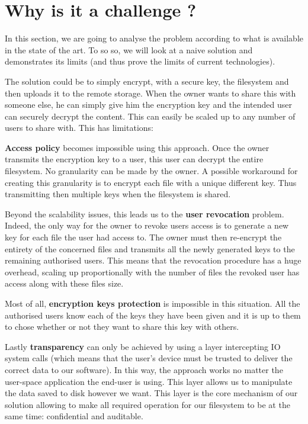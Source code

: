 \documentclass[../main.tex]{subfiles}
\begin{document}
\section{Why is it a challenge ?}
\label{section:problem:why_a_challenge}

\par In this section, we are going to analyse the problem according to what is available in the state of the art. To so so, we will look at a naive solution and demonstrates its limits (and thus prove the limits of current technologies).
\par The solution could be to simply encrypt, with a secure key, the filesystem and then uploads it to the remote storage. When the owner wants to share this with someone else, he can simply give him the encryption key and the intended user can securely decrypt the content. This can easily be scaled up to any number of users to share with. This has limitations:
\par \textbf{Access policy} becomes impossible using this approach. Once the owner transmits the encryption key to a user, this user can decrypt the entire filesystem. No granularity can be made by the owner. A possible workaround for creating this granularity is to encrypt each file with a unique different key. Thus transmitting then multiple keys when the filesystem is shared.
\par Beyond the scalability issues, this leads us to the \textbf{user revocation} problem. Indeed, the only way for the owner to revoke users access is to generate a new key for each file the user had access to. The owner must then re-encrypt the entirety of the concerned files and transmits all the newly generated keys to the remaining authorised users. This means that the revocation procedure has a huge overhead, scaling up proportionally with the number of files the revoked user has access along with these files size.
\par Most of all, \textbf{encryption keys protection} is impossible in this situation. All the authorised users know each of the keys they have been given and it is up to them to chose whether or not they want to share this key with others.
\par Lastly \textbf{transparency} can only be achieved by using a layer intercepting IO system calls (which means that the user's device must be trusted to deliver the correct data to our software). In this way, the approach works no matter the user-space application the end-user is using. This layer allows us to manipulate the data saved to disk however we want. This layer is the core mechanism of our solution allowing to make all required operation for our filesystem to be at the same time: confidential and auditable.
\end{document}
